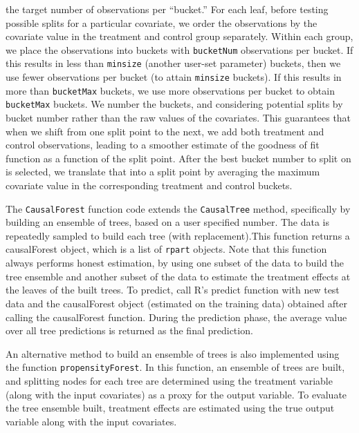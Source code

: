 \documentclass[11pt]{article}
\begin{document}
the target number of observations per ``bucket.'' For each leaf, before testing possible
splits for a particular covariate, we order the observations by the covariate value in the treatment and control group separately.  Within each group, we place the observations into buckets with \texttt{bucketNum} observations per bucket.  If this results in less than \texttt{minsize} (another user-set parameter) buckets, then we use fewer observations
per bucket (to attain \texttt{minsize} buckets). If this results in more than \texttt{bucketMax} buckets, we use more observations per bucket to obtain \texttt{bucketMax} buckets.
We number the buckets, and considering potential splits by bucket number rather than the raw
values of the covariates.  This guarantees that when we shift from one split point to the next, we add both treatment and
control observations, leading to a smoother estimate of the goodness of fit function as a function of the split point.  After the
best bucket number to split on is selected, we translate that into a split point by averaging the maximum covariate value in
the corresponding treatment and control buckets.\par

The \texttt{CausalForest} function code extends the \texttt{CausalTree} method, specifically by building an ensemble of trees, based on a user specified number. The data is repeatedly sampled to build each tree (with replacement).This function returns a causalForest object, which is a list of \texttt{rpart} objects. Note that this function always performs honest estimation, by using one subset of the data to build the tree ensemble and another subset of the data to estimate the treatment effects at the leaves of the built trees. To predict, call R's predict function with new test data and the causalForest object (estimated on the training data) obtained after calling the causalForest function. During the prediction phase, the average value over all tree predictions is returned as the final prediction.

An alternative method to build an ensemble of trees is also implemented using the function \texttt{propensityForest}.
In this function, an ensemble of trees are built, and splitting nodes for each tree are determined using the treatment variable (along with the input covariates) as a proxy for the output variable. To evaluate the tree ensemble built, treatment effects are estimated using the true output variable along with the input covariates.
\end{document}
